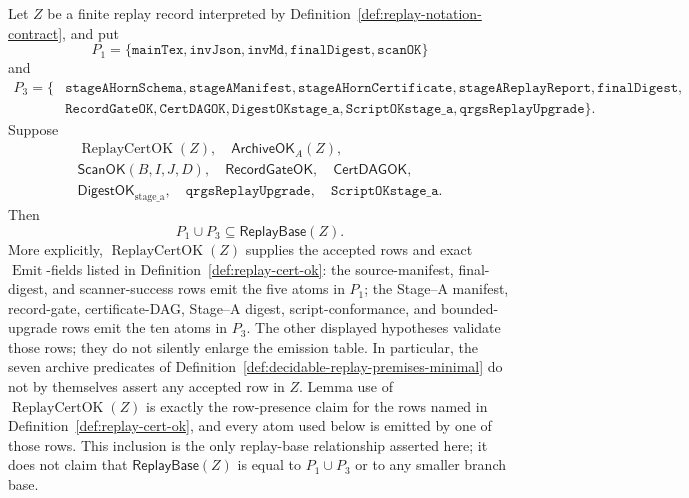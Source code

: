 \documentclass[runningheads]{llncs}
\newcommand{\ScanOK}{\mathsf{ScanOK}}
\newcommand{\RecordGateOK}{\mathsf{RecordGateOK}}
\newcommand{\CertDAGOK}{\mathsf{CertDAGOK}}
\newcommand{\DigestOKstageA}{\mathsf{DigestOK}_{\mathrm{stage\_a}}}
\newcommand{\ArchiveOKA}{\mathsf{ArchiveOK}_{A}}
\newcommand{\ReplayBase}{\mathsf{ReplayBase}}
\begin{document}
\begin{lemma}
\label{lem:operative-replay-premise-completeness}
Let \(Z\) be a finite replay record interpreted by
Definition~\ref{def:replay-notation-contract}, and put
\[
P_1=\{\texttt{mainTex},\texttt{invJson},\texttt{invMd},
\texttt{finalDigest},\texttt{scanOK}\}
\]
and
\[
\begin{aligned}
P_3=\{&
\texttt{stageAHornSchema},\texttt{stageAManifest},
\texttt{stageAHornCertificate},\texttt{stageAReplayReport},
\texttt{finalDigest},\\
&\texttt{RecordGateOK},\texttt{CertDAGOK},
\texttt{DigestOKstage\_a},\texttt{ScriptOKstage\_a},
\texttt{qrgsReplayUpgrade}\}.
\end{aligned}
\]
Suppose
\[
\begin{gathered}
\operatorname{ReplayCertOK}(Z),\quad \ArchiveOKA(Z),\\
\ScanOK(B,I,J,D),\quad \RecordGateOK,\quad \CertDAGOK,\\
\DigestOKstageA,\quad \texttt{qrgsReplayUpgrade},\quad
\texttt{ScriptOKstage\_a}.
\end{gathered}
\]
Then
\[
P_1\cup P_3\subseteq \ReplayBase(Z).
\]
More explicitly, \(\operatorname{ReplayCertOK}(Z)\) supplies the accepted rows
and exact \(\operatorname{Emit}\)-fields listed in
Definition~\ref{def:replay-cert-ok}: the source-manifest, final-digest, and
scanner-success rows emit the five atoms in \(P_1\); the Stage--A manifest,
record-gate, certificate-DAG, Stage--A digest, script-conformance, and
bounded-upgrade rows emit the ten atoms in \(P_3\).  The other displayed
hypotheses validate those rows; they do not silently enlarge the emission table.
In particular, the seven archive predicates of
Definition~\ref{def:decidable-replay-premises-minimal} do not by themselves
assert any accepted row in \(Z\).  Lemma use of
\(\operatorname{ReplayCertOK}(Z)\) is exactly the row-presence claim for the
rows named in Definition~\ref{def:replay-cert-ok}, and every atom used below is
emitted by one of those rows.
This inclusion is the only replay-base relationship asserted here; it does not
claim that \(\ReplayBase(Z)\) is equal to \(P_1\cup P_3\) or to any smaller
branch base.
\end{lemma}
\end{document}

